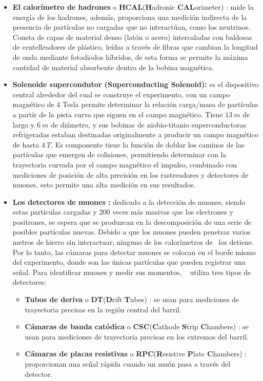 \begin{itemize}
\item \textbf{El calorímetro de hadrones} o \textbf{HCAL}(\textbf{H}adronic \textbf{CAL}orimeter) : mide la energía de los hadrones, además, proporciona una medición indirecta de la presencia de partículas no cargadas que no interactúan, como los neutrinos. Consta de capas de material denso (latón o acero) intercaladas con baldosas de centelleadores de plástico, leídas a través de fibras que cambian la longitud de onda mediante fotodiodos híbridos, de esta forma se permite la máxima cantidad de material absorbente dentro de la bobina magnética.

\item \textbf{Solenoide supercondutor (Superconducting Solenoid):} es el dispositivo central alrededor del cual se construye el experimento, con un campo magnético de 4 Tesla permite determinar la relación carga/masa de partículas a partir de la pista curva que siguen en el campo magnético. Tiene $13~m$ de largo y $6~m$ de diámetro, y sus bobinas de niobio-titanio superconductoras refrigeradas estaban destinadas originalmente a producir un campo magnético de hasta $4~T$. Es componente tiene la función de doblar los caminos de las partículas que emergen de colisiones, permitiendo determinar con la trayectoria curvada por el campo magnético el impulso, combinado con mediciones de posición de alta precisión en los rastreadores y detectores de muones, esto permite una alta medición en sus resultados.

\item \textbf{Los detectores de muones :} dedicado a la detección de muones, siendo estas partículas cargadas y 200 veces más masivas que los electrones y positrones, se espera que se produzcan en la descomposición de una serie de posibles partículas nuevas. Debido a que los muones pueden penetrar varios metros de hierro sin interactuar, ninguno de los calorímetros de \CMS ~los detiene. Por lo tanto, las cámaras para detectar muones se colocan en el borde mismo del experimento, donde son las únicas partículas que pueden registrar una señal. Para identificar muones y medir sus momentos, \CMS ~ utiliza tres tipos de detectores: 
\begin{itemize}
\item \textbf{Tubos de deriva} o \textbf{DT}(\textbf{D}rift \textbf{T}ubes) : se usan para mediciones de trayectoria precisas en la región central del barril.
\item \textbf{Cámaras de banda catódica} o \textbf{CSC}(\textbf{C}athode \textbf{S}trip \textbf{C}hambers) : se usan para mediciones de trayectoria precisas en los extremos del barril. 
\item \textbf{Cámaras de placas resistivas} o \textbf{RPC}(\textbf{R}esistive \textbf{P}late \textbf{C}hambers) : proporcionan una señal rápida cuando un muón pasa a través del detector.
\end{itemize}

\end{itemize}
